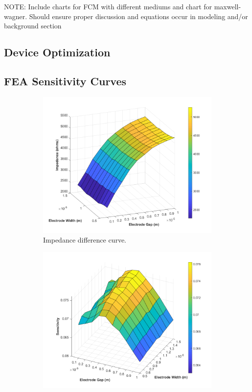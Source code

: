 \par NOTE: Include charts for FCM with different mediums and chart for maxwell-wagner. Should ensure proper discussion and equations occur in modeling and/or background section


\subsection{Device Optimization}


\subsection*{FEA Sensitivity Curves}

\begin{figure}[h]
    \centering
    \begin{subfigure}[t]{0.49\textwidth}
        \centering
        \includegraphics[width=\textwidth]{images/comsol_simple_difference.png}
        \caption{Impedance difference curve.}
    \end{subfigure}
    \hfill
    \begin{subfigure}[t]{0.49\textwidth}
        \centering
        \includegraphics[width=\textwidth]{images/comsol_simple_sensitivity_surface.png}

\end{subfigure}
\end{figure}

